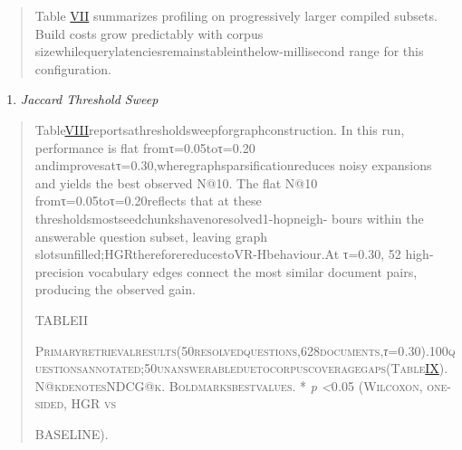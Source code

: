 \documentclass[
]{article}
\begin{document}
\begin{quote}
Table \hyperref[_bookmark16]{VII} summarizes profiling on progressively larger compiled subsets. Build costs grow predictably with corpus sizewhilequerylatenciesremainstableinthelow-millisecond range for this configuration.
\end{quote}

\begin{enumerate}
\def\labelenumi{\Alph{enumi}.}
\setcounter{enumi}{7}
\item
  \emph{Jaccard Threshold Sweep}
\end{enumerate}

\begin{quote}
Table\hyperref[_bookmark18]{VIII}reportsathresholdsweepforgraphconstruction. In this run, performance is flat fromτ=0.05toτ=0.20 andimprovesatτ=0.30,wheregraphsparsificationreduces noisy expansions and yields the best observed N@10. The flat N@10 fromτ=0.05toτ=0.20reflects that at these thresholdsmostseedchunkshavenoresolved1-hopneigh- bours within the answerable question subset, leaving graph slotsunfilled;HGRthereforereducestoVR-Hbehaviour.At τ=0.30, 52 high-precision vocabulary edges connect the most similar document pairs, producing the observed gain.

\protect{}\label{_bookmark10}{}TABLEII

\textsc{Primaryretrievalresults(50resolvedquestions,628documents,}\emph{τ}=0\emph{.}30\textsc{).100questionsannotated;50unanswerableduetocorpuscoveragegaps(Table\hyperref[_bookmark17]{IX}). N@kdenotesNDCG@k. Boldmarksbestvalues. *} \emph{p \textless{}}0\emph{.}05 \textsc{(Wilcoxon, one-sided, HGR vs}

BASELINE).
\end{quote}
\end{document}
